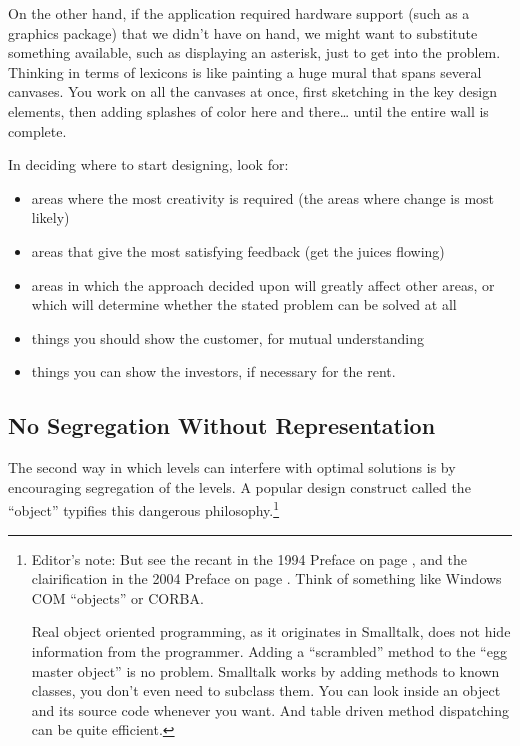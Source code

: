 On the other hand, if the application required hardware support (such as a
graphics package) that we didn't have on hand, we might want to
substitute something available, such as displaying an asterisk, just to
get into the problem. Thinking in terms of lexicons is like painting a
huge mural that spans several canvases. You work on all the canvases at
once, first sketching in the key design elements, then adding splashes of
color here and there\dots{} until the entire wall is complete.

\begin{tip}
In deciding where to start designing, look for:\medskip
\begin{itemize}
\item areas where the most creativity is required (the areas where change
is most likely)
\item areas that give the most satisfying feedback (get the juices
flowing)
\item areas in which the approach decided upon will greatly affect other
areas, or which will determine whether the stated problem can be solved at
all
\item things you should show the customer, for mutual understanding
\item things you can show the investors, if necessary for the rent.
\end{itemize}
\end{tip}

\subsection{No Segregation Without Representation}%
%
The second way in which levels can interfere with optimal solutions is
by encouraging segregation of the levels. A popular design construct
called the ``object'' typifies this dangerous
philosophy.\ifeightyfour\else\footnote{Editor's note: But see the
recant in the 1994 Preface on page \pageref{preface94}\ifofour, and
the clairification in the 2004 Preface on page
\pageref{preface2004}\fi. Think of something like Windows COM
``objects'' or CORBA.

Real object oriented programming, as it originates in Smalltalk, does
not hide information from the programmer. Adding a ``scrambled''
method to the ``egg master object'' is no problem. Smalltalk works by adding
methods to known classes, you don't even need to subclass them. You
can look inside an object and its source code whenever you want. And
table driven method dispatching can be quite efficient.
\hfill{}}\fi

